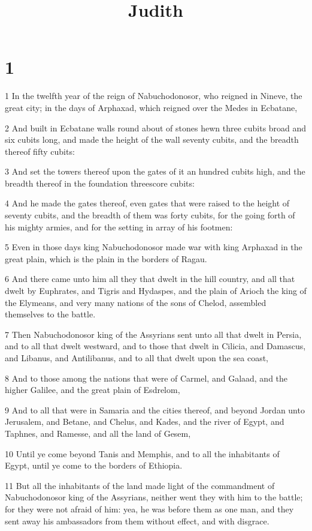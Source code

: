 

\title{Judith}


\chapter{1}

\par 1 In the twelfth year of the reign of Nabuchodonosor, who reigned in Nineve, the great city; in the days of Arphaxad, which reigned over the Medes in Ecbatane,
\par 2 And built in Ecbatane walls round about of stones hewn three cubits broad and six cubits long, and made the height of the wall seventy cubits, and the breadth thereof fifty cubits:
\par 3 And set the towers thereof upon the gates of it an hundred cubits high, and the breadth thereof in the foundation threescore cubits:
\par 4 And he made the gates thereof, even gates that were raised to the height of seventy cubits, and the breadth of them was forty cubits, for the going forth of his mighty armies, and for the setting in array of his footmen:
\par 5 Even in those days king Nabuchodonosor made war with king Arphaxad in the great plain, which is the plain in the borders of Ragau.
\par 6 And there came unto him all they that dwelt in the hill country, and all that dwelt by Euphrates, and Tigris and Hydaspes, and the plain of Arioch the king of the Elymeans, and very many nations of the sons of Chelod, assembled themselves to the battle.
\par 7 Then Nabuchodonosor king of the Assyrians sent unto all that dwelt in Persia, and to all that dwelt westward, and to those that dwelt in Cilicia, and Damascus, and Libanus, and Antilibanus, and to all that dwelt upon the sea coast,
\par 8 And to those among the nations that were of Carmel, and Galaad, and the higher Galilee, and the great plain of Esdrelom,
\par 9 And to all that were in Samaria and the cities thereof, and beyond Jordan unto Jerusalem, and Betane, and Chelus, and Kades, and the river of Egypt, and Taphnes, and Ramesse, and all the land of Gesem,
\par 10 Until ye come beyond Tanis and Memphis, and to all the inhabitants of Egypt, until ye come to the borders of Ethiopia.
\par 11 But all the inhabitants of the land made light of the commandment of Nabuchodonosor king of the Assyrians, neither went they with him to the battle; for they were not afraid of him: yea, he was before them as one man, and they sent away his ambassadors from them without effect, and with disgrace.
